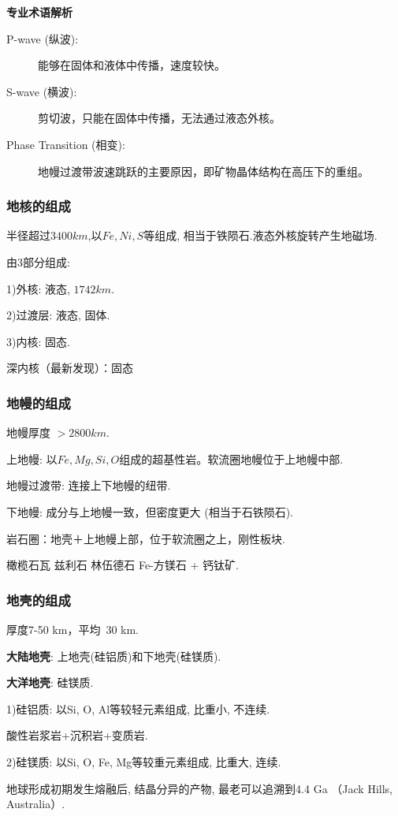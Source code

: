 \documentclass[12pt,a4paper]{article}
\begin{document}
	\textbf{专业术语解析}
	\begin{description}
		\item[P-wave (纵波):] 能够在固体和液体中传播，速度较快。
		\item[S-wave (横波):] 剪切波，只能在固体中传播，无法通过液态外核。
		\item[Phase Transition (相变):] 地幔过渡带波速跳跃的主要原因，即矿物晶体结构在高压下的重组。
	\end{description}
	
	\subsubsection{地核的组成}
	
	半径超过$3400 km$,以$Fe, Ni, S$等组成, 相当于铁陨石.液态外核旋转产生地磁场.
	
	由3部分组成:
	
	1)外核: 液态, $1742 km$.
	
	2)过渡层: 液态, 固体.
	
	3)内核: 固态.
	
	深内核（最新发现）：固态
	\subsubsection{地幔的组成}
	地幔厚度 $>2800 km$.
	
	上地幔: 以$Fe, Mg, Si, O$组成的超基性岩。软流圈地幔位于上地幔中部.
	
	地幔过渡带: 连接上下地幔的纽带.
	
	下地幔: 成分与上地幔一致，但密度更大 (相当于石铁陨石).
	
	岩石圈：地壳＋上地幔上部，位于软流圈之上，刚性板块.
	
	橄榄石瓦 兹利石 林伍德石 Fe-方镁石 + 钙钛矿.
	
	\subsubsection{地壳的组成}
	厚度7-50 km，平均~30 km.
	
	\textbf{大陆地壳}: 上地壳(硅铝质)和下地壳(硅镁质).
	
	\textbf{大洋地壳}: 硅镁质.
	
	1){硅铝质}: 以Si, O, Al等较轻元素组成, 比重小, 不连续.
	
		酸性岩浆岩+沉积岩+变质岩.
	
	2){硅镁质}: 以Si, O, Fe, Mg等较重元素组成, 比重大, 连续.
	
	地球形成初期发生熔融后, 结晶分异的产物, 最老可以追溯到4.4 Ga （Jack Hills, Australia）.
	
\end{document}
